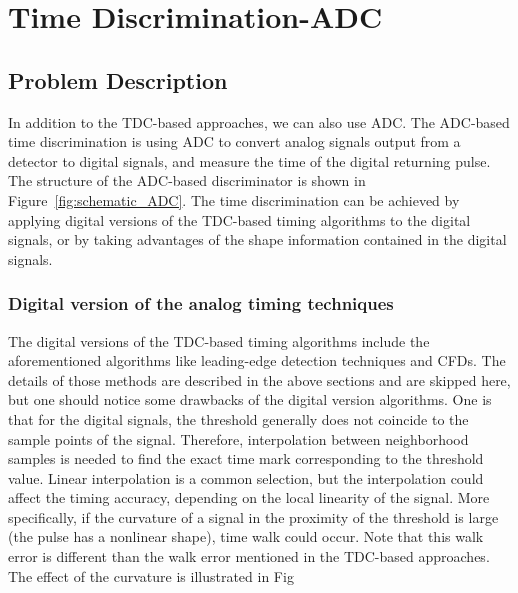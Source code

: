 

\chapter{Time Discrimination-ADC}\label{ch:ADC_BM}
\section{Problem Description}
In addition to the TDC-based approaches, we can also use ADC. The ADC-based time discrimination is using ADC to convert analog signals output from a detector to digital signals, and measure the time of the digital returning pulse. The structure of the ADC-based discriminator is shown in Figure~\ref{fig:schematic_ADC}. The time discrimination can be achieved by applying digital versions of the TDC-based timing algorithms to the digital signals, or by taking advantages of the shape information contained in the digital signals.
\subsection{Digital version of the analog timing techniques}
 The digital versions of the TDC-based timing algorithms include the aforementioned algorithms like leading-edge detection techniques and CFDs. The details of those methods are described in the above sections and are skipped here, but one should notice some drawbacks of the digital version algorithms. One is that for the digital signals, the threshold generally does not coincide to the sample points of the signal. Therefore, interpolation between neighborhood samples is needed to find the exact time mark corresponding to the threshold value. Linear interpolation is a common selection, but the interpolation could affect the timing accuracy, depending on the local linearity of the signal. More specifically, if the curvature of a signal in the proximity of the threshold is large (the pulse has a nonlinear shape), time walk could occur. Note that this walk error is different than the walk error mentioned in the TDC-based approaches. The effect of the curvature is illustrated in Fig 
